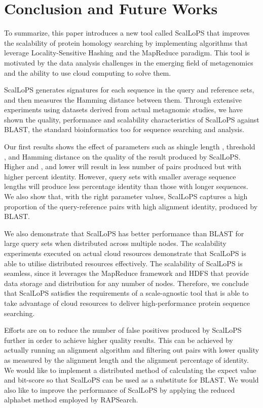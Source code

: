 \documentclass[titlepage]{csetr}
\begin{document}
\section{Conclusion and Future Works}
\label{sec:FutureWorks}
To summarize, this paper introduces a new tool called ScalLoPS that improves the scalability of protein homology searching by implementing algorithms that leverage Locality-Sensitive Hashing and the MapReduce paradigm. This tool is motivated by the data analysis challenges in the emerging field of metagenomics and the ability to use cloud computing to solve them. 

ScalLoPS generates signatures for each sequence in the query and reference sets, and then measures the Hamming distance between them. Through extensive experiments using datasets derived from actual metagnomic studies, we have shown the quality, performance and scalability characteristics of ScalLoPS against BLAST, the standard bioinformatics too for sequence searching and analysis. 

Our first results shows the effect of parameters such as shingle length , threshold , and Hamming distance  on the quality of the result produced by ScalLoPS. Higher  and , and lower  will result in less number of pairs produced but with higher percent identity.  However, query sets with smaller average sequence lengths will produce less percentage identity than those with longer sequences. We also show that, with the right parameter values, ScalLoPS captures a high proportion of the query-reference pairs with high alignment identity, produced by BLAST. 

We also demonstrate that ScalLoPS has better performance than BLAST for large query sets when distributed across multiple nodes. The scalability experiments executed on actual cloud resources demonstrate that ScalLoPS is able to utilise distributed resources effectively. The scalability of ScalLoPS is seamless, since it leverages the MapReduce framework and HDFS that provide data storage and distribution for any number of nodes. Therefore, we conclude that ScalLoPS satisfies the requirements of a scale-agnostic tool that is able to take advantage of cloud resources to deliver high-performance protein sequence searching.

Efforts are on to reduce the number of false positives produced by ScalLoPS further in order to achieve higher quality results. This can be achieved by actually running an alignment algorithm and filtering out pairs with lower quality as measured by the alignment length and the alignment percentage of identity. We would like to implement a distributed method of calculating the expect value and bit-score so that ScalLoPS can be used as a substitute for BLAST. We would also like to improve the performance of ScalLoPS by applying the reduced alphabet method employed by RAPSearch.













\end{document}
